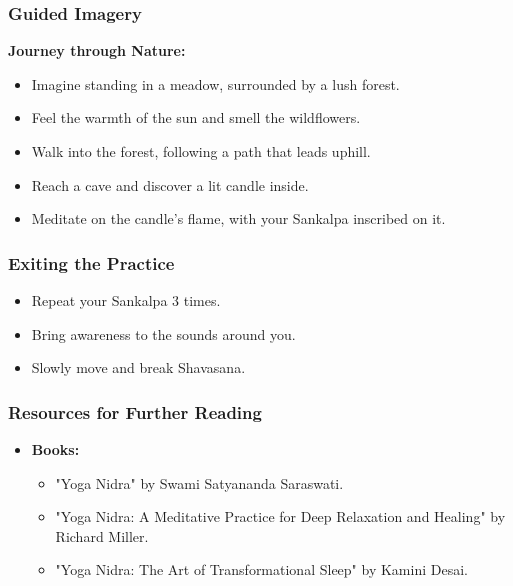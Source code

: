 \begin{frame}[fragile]\frametitle{Guided Imagery}
    \textbf{Journey through Nature:}
    \begin{itemize}
        \item Imagine standing in a meadow, surrounded by a lush forest.
        \item Feel the warmth of the sun and smell the wildflowers.
        \item Walk into the forest, following a path that leads uphill.
        \item Reach a cave and discover a lit candle inside.
        \item Meditate on the candle's flame, with your Sankalpa inscribed on it.
    \end{itemize}
\end{frame}

\begin{frame}[fragile]\frametitle{Exiting the Practice}
    \begin{itemize}
        \item Repeat your Sankalpa 3 times.
        \item Bring awareness to the sounds around you.
        \item Slowly move and break Shavasana.
    \end{itemize}
\end{frame}

\begin{frame}[fragile]\frametitle{Resources for Further Reading}
    \begin{itemize}
        \item \textbf{Books:}
        \begin{itemize}
            \item "Yoga Nidra" by Swami Satyananda Saraswati.
            \item "Yoga Nidra: A Meditative Practice for Deep Relaxation and Healing" by Richard Miller.
            \item "Yoga Nidra: The Art of Transformational Sleep" by Kamini Desai.
        \end{itemize}
    \end{itemize}
\end{frame}